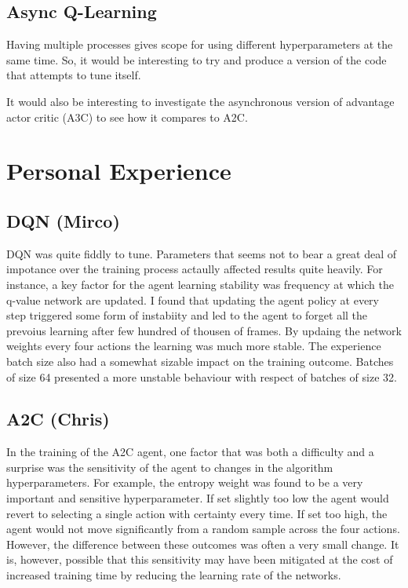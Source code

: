 \documentclass{article}
\begin{document}
\subsection{Async Q-Learning}

Having multiple processes gives scope for using different hyperparameters at the same time. So, it would be interesting to try and produce a version of the code that attempts to tune itself.

It would also be interesting to investigate the asynchronous version of advantage actor critic (A3C) to see how it compares to A2C.

\section{Personal Experience}

\subsection{DQN (Mirco)}
DQN was quite fiddly to tune. Parameters that seems not to bear a great deal of impotance over the training process actaully affected results quite heavily. For instance, a key factor for the agent learning stability was frequency at which the q-value network are updated. I found that updating the agent policy at every step triggered some form of instabiity and led to the agent to forget all the prevoius learning after few hundred of thousen of frames. By updaing the network weights every four actions the learning was much more stable. The experience batch size also had a somewhat sizable impact on the training outcome. Batches of size 64 presented a more unstable behaviour with  respect of batches of size 32.  

\subsection{A2C (Chris)}

In the training of the A2C agent, one factor that was both a difficulty and a surprise was the sensitivity of the agent to changes in the algorithm hyperparameters. For example, the entropy weight was found to be a very important and sensitive hyperparameter. If set slightly too low the agent would revert to selecting a single action with certainty every time. If set too high, the agent would not move significantly from a random sample across the four actions. However, the difference between these outcomes was often a very small change. It is, however, possible that this sensitivity may have been mitigated at the cost of increased training time by reducing the learning rate of the networks.
\end{document}
